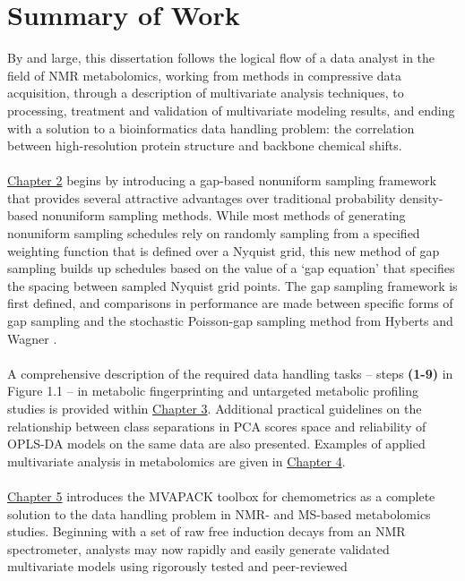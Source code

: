 \section{Summary of Work}

\begin{doublespace}
By and large, this dissertation follows the logical flow of a data analyst
in the field of NMR metabolomics, working from methods in compressive data
acquisition, through a description of multivariate analysis techniques, to
processing, treatment and validation of multivariate modeling results, and
ending with a solution to a bioinformatics data handling problem: the
correlation between high-resolution protein structure and backbone chemical
shifts.
\\\\
\hyperlink{chapter.2}{Chapter 2} begins by introducing a gap-based nonuniform
sampling framework that provides several attractive advantages over traditional
probability density-based nonuniform sampling methods. While most methods of
generating nonuniform sampling schedules rely on randomly sampling from a
specified weighting function that is defined over a Nyquist grid, this new
method of gap sampling builds up schedules based on the value of a `gap
equation' that specifies the spacing between sampled Nyquist grid points. The
gap sampling framework is first defined, and comparisons in performance are
made between specific forms of gap sampling and the stochastic Poisson-gap
sampling method from Hyberts and Wagner \cite{hyberts:jacs2010}.
\\\\
A comprehensive description of the required data handling tasks -- steps
{\bf (1-9)} in Figure 1.1 -- in metabolic fingerprinting and untargeted
metabolic profiling studies is provided within
\hyperlink{chapter.3}{Chapter 3}. Additional practical guidelines on the
relationship between class separations in PCA scores space and reliability
of OPLS-DA models on the same data are also presented. Examples of applied
multivariate analysis in metabolomics are given in
\hyperlink{chapter.4}{Chapter 4}.
\\\\
\hyperlink{chapter.5}{Chapter 5} introduces the MVAPACK toolbox for
chemometrics as a complete solution to the data handling problem in NMR-
and MS-based metabolomics studies. Beginning with a set of raw free induction
decays from an NMR spectrometer, analysts may now rapidly and easily generate
validated multivariate models using rigorously tested and peer-reviewed

\end{doublespace}

